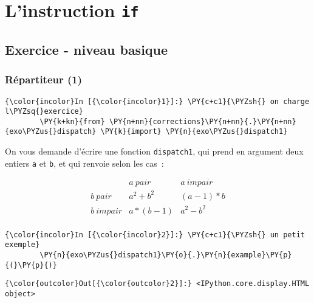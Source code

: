     
    
    
    

    

    \hypertarget{linstruction-if}{%
\section{\texorpdfstring{L'instruction
\texttt{if}}{L'instruction if}}\label{linstruction-if}}

    \hypertarget{exercice---niveau-basique}{%
\subsection{Exercice - niveau basique}\label{exercice---niveau-basique}}

    \hypertarget{ruxe9partiteur-1}{%
\subsubsection{Répartiteur (1)}\label{ruxe9partiteur-1}}

    \begin{Verbatim}[commandchars=\\\{\}]
{\color{incolor}In [{\color{incolor}1}]:} \PY{c+c1}{\PYZsh{} on charge l\PYZsq{}exercice}
        \PY{k+kn}{from} \PY{n+nn}{corrections}\PY{n+nn}{.}\PY{n+nn}{exo\PYZus{}dispatch} \PY{k}{import} \PY{n}{exo\PYZus{}dispatch1}
\end{Verbatim}


    On vous demande d'écrire une fonction \texttt{dispatch1}, qui prend en
argument deux entiers \texttt{a} et \texttt{b}, et qui renvoie selon les
cas~:

\[
\begin{array}{c|c|c}
\ & a\  pair & a\ impair \\
\hline
b\ pair & a^2+b^2 & (a-1)*b\\
\hline
b\ impair & a*(b-1)& a^2-b^2\\
\end{array}
\]

    \begin{Verbatim}[commandchars=\\\{\}]
{\color{incolor}In [{\color{incolor}2}]:} \PY{c+c1}{\PYZsh{} un petit exemple}
        \PY{n}{exo\PYZus{}dispatch1}\PY{o}{.}\PY{n}{example}\PY{p}{(}\PY{p}{)}
\end{Verbatim}


\begin{Verbatim}[commandchars=\\\{\}]
{\color{outcolor}Out[{\color{outcolor}2}]:} <IPython.core.display.HTML object>
\end{Verbatim}
            
